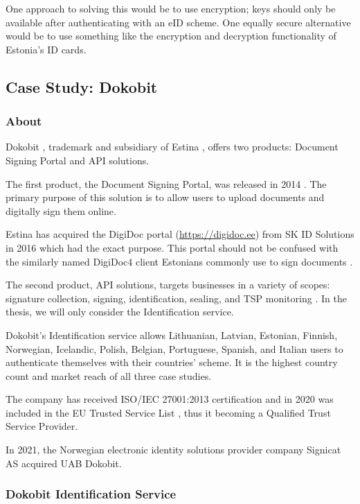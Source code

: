 One approach to solving this would be to use encryption; keys should only be available after authenticating with an eID scheme. One equally secure alternative would be to use something like the encryption and decryption functionality of Estonia's ID cards.

\subsection{Case Study: Dokobit}

\subsubsection{About}

Dokobit \cite{dokobit}, trademark and subsidiary of Estina \cite{euipo-dokobit}, offers two products: Document Signing Portal and API solutions.

The first product, the Document Signing Portal, was released in 2014 \cite{dokobit-aboutus}. The primary purpose of this solution is to allow users to upload documents and digitally sign them online.

Estina has acquired the DigiDoc portal (\url{https://digidoc.ee}) from SK ID Solutions in 2016 \cite{sk-digidocacquired} which had the exact purpose. This portal should not be confused with the similarly named DigiDoc4 client Estonians commonly use to sign documents \cite{ria-idee}.

The second product, API solutions, targets businesses in a variety of scopes: signature collection, signing, identification, sealing, and TSP monitoring \cite{dokobit}. In the thesis, we will only consider the Identification service.

Dokobit's Identification service allows Lithuanian, Latvian, Estonian, Finnish, Norwegian, Icelandic, Polish, Belgian, Portuguese, Spanish, and Italian \cite{dokobit} users to authenticate themselves with their countries' scheme. It is the highest country count and market reach of all three case studies.

The company has received ISO/IEC 27001:2013 certification \cite{dokobit-certification} and in 2020 was included in the EU Trusted Service List \cite{eu-trustservices, dokobit-aboutus}, thus it becoming a Qualified Trust Service Provider.

In 2021, the Norwegian electronic identity solutions provider company Signicat AS acquired UAB Dokobit.

\subsubsection{Dokobit Identification Service}


